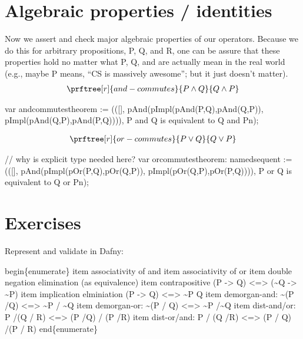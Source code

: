 \documentclass[letterpaper,10pt,english]{sphinxmanual}
\begin{document}
\section{Algebraic properties / identities}
\label{\detokenize{13-consequence:algebraic-properties-identities}}
Now we assert and check major algebraic properties of our
operators. Because we do this for arbitrary propositions, P, Q, and R,
one can be assure that these properties hold no matter what P, Q, and
are actually mean in the real world (e.g., maybe P means, “CS is
massively awesome”; but it just doesn’t matter).
\begin{equation*}
\begin{split}\prftree[r]{and-commutes}{P \land Q}{Q \land P}\end{split}
\end{equation*}
\begin{sphinxVerbatim}[commandchars=\\\{\}]
var and\PYGZus{}commutes\PYGZus{}theorem  := (([],
                          pAnd(pImpl(pAnd(P,Q),pAnd(Q,P)),
                               pImpl(pAnd(Q,P),pAnd(P,Q)))),
                          \PYGZdq{}P and Q is equivalent to Q and P\PYGZbs{}n\PYGZdq{});
\end{sphinxVerbatim}
\begin{equation*}
\begin{split}\prftree[r]{or-commutes}{P \lor Q}{Q \lor P}\end{split}
\end{equation*}
\begin{sphinxVerbatim}[commandchars=\\\{\}]
// why is explicit type needed here?
var or\PYGZus{}commutes\PYGZus{}theorem: named\PYGZus{}sequent  := (([],
                        pAnd(pImpl(pOr(P,Q),pOr(Q,P)),
                             pImpl(pOr(Q,P),pOr(P,Q)))),
                        \PYGZdq{}P or Q is equivalent to Q or P\PYGZbs{}n\PYGZdq{});
\end{sphinxVerbatim}


\section{Exercises}
\label{\detokenize{13-consequence:exercises}}
Represent and validate in Dafny:

begin\{enumerate\}
item associativity of and
item associativity of or
item double negation elimination (as equivalence)
item contrapositive (P -\textgreater{} Q) \textless{}=\textgreater{} (\textasciitilde{}Q -\textgreater{} \textasciitilde{}P)
item implication elminiation (P -\textgreater{} Q) \textless{}=\textgreater{} \textasciitilde{}P \textbar{}\textbar{} Q
item demorgan-and: \textasciitilde{}(P /Q) \textless{}=\textgreater{} \textasciitilde{}P / \textasciitilde{}Q
item demorgan-or: \textasciitilde{}(P / Q) \textless{}=\textgreater{} \textasciitilde{}P /\textasciitilde{}Q
item dist-and/or: P /(Q / R) \textless{}=\textgreater{} (P /Q) / (P /R)
item dist-or/and: P / (Q /R) \textless{}=\textgreater{} (P / Q) /(P / R)
end\{enumerate\}
\end{document}
